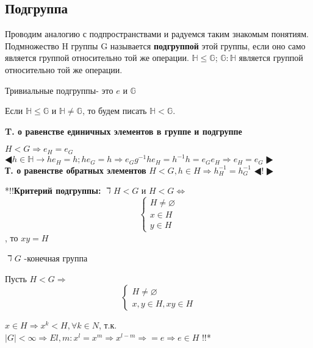\documentclass[12pt]{article}
\begin{document}
		\newpage


		\subsection{Подгруппа}
		
		Проводим аналогию с подпространствами и радуемся таким знакомым понятиям. \\
		Подмножество H группы G называется \hypertarget{indef_subgroup}{\textbf{подгруппой}} этой группы, если оно само является группой относительно той же операции.
		$\mathds{H} \le \mathds{G}$;
		$\mathds{G}:\mathds{H}$ является группой относительно той же операции. 
		
		Тривиальные подгруппы- это $e$ и $\mathds{G}$
		
		Если $\mathds{H}\le \mathds{G}$ и $\mathds{H} \not= \mathds{G}$, то будем писать $\mathds{H}<\mathds{G}$.
		
		\hypertarget{th:subgrop_e}{\textbf{T. о равенстве единичных элементов в группе и подгруппе}} $H<G \Rightarrow e_H=e_G$
		$\LHD h \in \mathds{H} \rightarrow he_H=h ; he_G=h \Rightarrow  e_Gg^{-1}he_H=h^{-1}h=e_Ge_H \Rightarrow e_H=e_G \RHD$ \\
		
		\hypertarget{th:subgroup_-1}{\textbf{Т. о равенстве обратных элементов}} $H<G, h \in H \Rightarrow h_H^{-1}=h_G^{-1}$
		$\LHD ! \RHD$
		
		*!!\hypertarget{th_subgroup_cri}{\textbf{Критерий подгруппы:}}  $ \daleth  H<G$ и $H<G \Leftrightarrow $ 
		\begin{equation*}
		\begin{cases}
		H \not= \varnothing 
		\\
		x \in H
		\\
		y \in H
		\end{cases}
		\end{equation*} , то $xy=H$ 
		
		$\daleth G$ -конечная группа 
		
		Пусть $H<G  \Rightarrow$ 
		\begin{equation*}
		\begin{cases}
		H \not= \varnothing  
		\\
		x,y \in H, xy \in H
		\end{cases}
		\end{equation*}
		
		$x\in H \Rightarrow x^k <H, \forall k \in N$, т.к. $|G|<\infty\Rightarrow E l,m : x^l=x^m\Rightarrow x^{l-m}\Rightarrow =e \Rightarrow e \in H$ !!*
		
\end{document}
